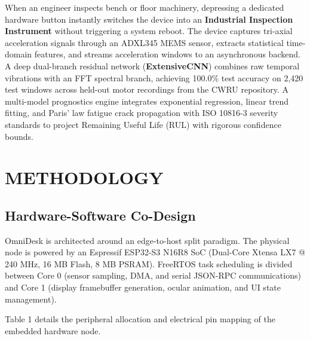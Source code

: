 \documentclass[10pt,journal,onecolumn]{IEEEtran}
\begin{document}
When an engineer inspects bench or floor machinery, depressing a dedicated hardware button instantly switches the device into an \textbf{Industrial Inspection Instrument} without triggering a system reboot. The device captures tri-axial acceleration signals through an ADXL345 MEMS sensor, extracts statistical time-domain features, and streams acceleration windows to an asynchronous backend. A deep dual-branch residual network (\textbf{ExtensiveCNN}) combines raw temporal vibrations with an FFT spectral branch, achieving 100.0\% test accuracy on 2,420 test windows across held-out motor recordings from the CWRU repository. A multi-model prognostics engine integrates exponential regression, linear trend fitting, and Paris' law fatigue crack propagation with ISO 10816-3 severity standards to project Remaining Useful Life (RUL) with rigorous confidence bounds.

\section{METHODOLOGY}
\subsection{Hardware-Software Co-Design}
OmniDesk is architected around an edge-to-host split paradigm. The physical node is powered by an Espressif ESP32-S3 N16R8 SoC (Dual-Core Xtensa LX7 @ 240 MHz, 16 MB Flash, 8 MB PSRAM). FreeRTOS task scheduling is divided between Core 0 (sensor sampling, DMA, and serial JSON-RPC communications) and Core 1 (display framebuffer generation, ocular animation, and UI state management).

Table 1 details the peripheral allocation and electrical pin mapping of the embedded hardware node.
\end{document}
